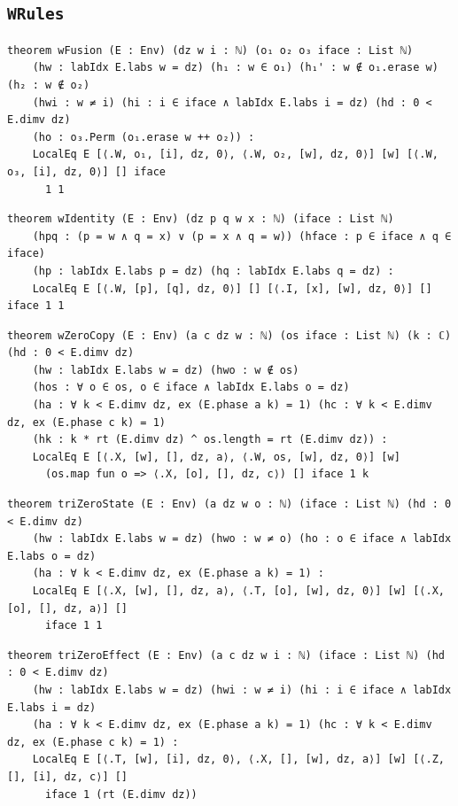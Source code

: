\subsection{\texttt{WRules}}
\begin{lstlisting}[style=leancore]
theorem wFusion (E : Env) (dz w i : ℕ) (o₁ o₂ o₃ iface : List ℕ)
    (hw : labIdx E.labs w = dz) (h₁ : w ∈ o₁) (h₁' : w ∉ o₁.erase w) (h₂ : w ∉ o₂)
    (hwi : w ≠ i) (hi : i ∈ iface ∧ labIdx E.labs i = dz) (hd : 0 < E.dimv dz)
    (ho : o₃.Perm (o₁.erase w ++ o₂)) :
    LocalEq E [⟨.W, o₁, [i], dz, 0⟩, ⟨.W, o₂, [w], dz, 0⟩] [w] [⟨.W, o₃, [i], dz, 0⟩] [] iface
      1 1
\end{lstlisting}
\begin{lstlisting}[style=leancore]
theorem wIdentity (E : Env) (dz p q w x : ℕ) (iface : List ℕ)
    (hpq : (p = w ∧ q = x) ∨ (p = x ∧ q = w)) (hface : p ∈ iface ∧ q ∈ iface)
    (hp : labIdx E.labs p = dz) (hq : labIdx E.labs q = dz) :
    LocalEq E [⟨.W, [p], [q], dz, 0⟩] [] [⟨.I, [x], [w], dz, 0⟩] [] iface 1 1
\end{lstlisting}
\begin{lstlisting}[style=leancore]
theorem wZeroCopy (E : Env) (a c dz w : ℕ) (os iface : List ℕ) (k : ℂ) (hd : 0 < E.dimv dz)
    (hw : labIdx E.labs w = dz) (hwo : w ∉ os)
    (hos : ∀ o ∈ os, o ∈ iface ∧ labIdx E.labs o = dz)
    (ha : ∀ k < E.dimv dz, ex (E.phase a k) = 1) (hc : ∀ k < E.dimv dz, ex (E.phase c k) = 1)
    (hk : k * rt (E.dimv dz) ^ os.length = rt (E.dimv dz)) :
    LocalEq E [⟨.X, [w], [], dz, a⟩, ⟨.W, os, [w], dz, 0⟩] [w]
      (os.map fun o => ⟨.X, [o], [], dz, c⟩) [] iface 1 k
\end{lstlisting}
\begin{lstlisting}[style=leancore]
theorem triZeroState (E : Env) (a dz w o : ℕ) (iface : List ℕ) (hd : 0 < E.dimv dz)
    (hw : labIdx E.labs w = dz) (hwo : w ≠ o) (ho : o ∈ iface ∧ labIdx E.labs o = dz)
    (ha : ∀ k < E.dimv dz, ex (E.phase a k) = 1) :
    LocalEq E [⟨.X, [w], [], dz, a⟩, ⟨.T, [o], [w], dz, 0⟩] [w] [⟨.X, [o], [], dz, a⟩] []
      iface 1 1
\end{lstlisting}
\begin{lstlisting}[style=leancore]
theorem triZeroEffect (E : Env) (a c dz w i : ℕ) (iface : List ℕ) (hd : 0 < E.dimv dz)
    (hw : labIdx E.labs w = dz) (hwi : w ≠ i) (hi : i ∈ iface ∧ labIdx E.labs i = dz)
    (ha : ∀ k < E.dimv dz, ex (E.phase a k) = 1) (hc : ∀ k < E.dimv dz, ex (E.phase c k) = 1) :
    LocalEq E [⟨.T, [w], [i], dz, 0⟩, ⟨.X, [], [w], dz, a⟩] [w] [⟨.Z, [], [i], dz, c⟩] []
      iface 1 (rt (E.dimv dz))
\end{lstlisting}
